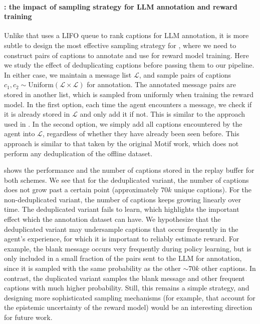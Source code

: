 \paragraph{\oniranking: the impact of sampling strategy for LLM annotation and reward training}
Unlike \onicls that uses a LIFO queue to rank captions for LLM annotation, it is more subtle to design the most effective sampling strategy for \oniranking, where we need to construct pairs of captions to annotate and use for reward model training.
Here we study the effect of deduplicating captions before passing them to our pipeline. In either case, we maintain a message list $\mathcal{L}$, and sample pairs of captions $c_1, c_2 \sim \text{Uniform}(\mathcal{L} \times \mathcal{L})$ for annotation. The annotated message pairs are stored in another list, which is sampled from uniformly when training the reward model.
%
In the first option, each time the agent encounters a message, we check if it is already stored in $\mathcal{L}$ and only add it if not. This is similar to the approach used in \onicls. 
%
In the second option, we simply add all captions encountered by the agent into $\mathcal{L}$, regardless of whether they have already been seen before. This approach is similar to that taken by the original Motif work, which does not perform any deduplication of the offline dataset. 
%

 shows the performance and the number of captions stored in the replay buffer for both schemes. We see that for the deduplicated variant, the number of captions does not grow past a certain point (approximately $70k$ unique captions). For the non-deduplicated variant, the number of captions keeps growing linearly over time. The deduplicated variant fails to learn, which highlights the important effect which the annotation dataset can have. We hypothesize that the deduplicated variant may undersample captions that occur frequently in the agent's experience, for which it is important to reliably estimate reward. For example, the blank message occurs very frequently during policy learning, but is only included in a small fraction of the pairs sent to the LLM for annotation, since it is sampled with the same probability as the other $\sim 70k$ other captions. In contrast, the duplicated variant samples the blank message and other frequent captions with much higher probability. Still, this remains a simple strategy, and designing more sophisticated sampling mechanisms (for example, that account for the epistemic uncertainty of the reward model) would be an interesting direction for future work.

